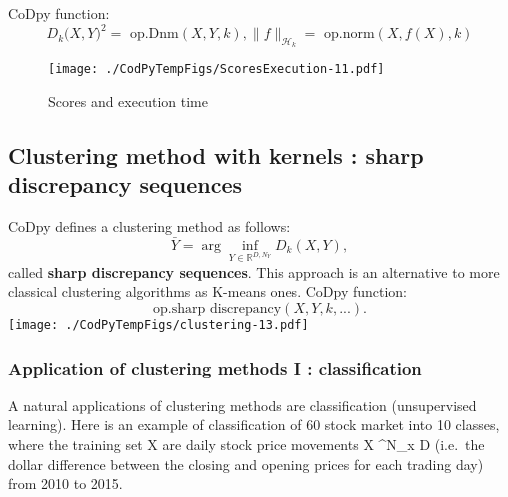 \documentclass[
]{article}
\def\({}%
\def\){}%
\numberwithin{equation}{section}
\newcommand \RR    {\mathbb{R}}
\begin{document}
CoDpy function:
\[D_k\big(X,Y\big)^2 = \text{ op.Dnm}(X,Y,k),\| f \|_{\mathcal{H}_k}=\text{ op.norm}(X,
f(X),k)\]

\begin{figure}
\centering
\texttt{[image: ./CodPyTempFigs/ScoresExecution-11.pdf]}
\caption{Scores and execution time}
\end{figure}

\newpage

\hypertarget{clustering-method-with-kernels-sharp-discrepancy-sequences}{%
\subsection{Clustering method with kernels : sharp discrepancy
sequences}\label{clustering-method-with-kernels-sharp-discrepancy-sequences}}

CoDpy defines a clustering method as follows:
\begin{equation} \label{cluster}
 \bar{Y} = \arg \inf_{Y \in \RR^{D,N_Y}} D_k(X,Y),
\end{equation} called \textbf{sharp discrepancy sequences}. This
approach is an alternative to more classical clustering algorithms as
K-means ones. CoDpy function: \[
\text{op.sharp discrepancy}(X,Y,k,...).
\] \texttt{[image: ./CodPyTempFigs/clustering-13.pdf]}

\newpage

\hypertarget{application-of-clustering-methods-i-classification}{%
\subsubsection{Application of clustering methods I :
classification}\label{application-of-clustering-methods-i-classification}}

A natural applications of clustering methods are classification
(unsupervised learning). Here is an example of classification of 60
stock market into 10 classes, where the training set \(X\) are daily
stock price movements \(X \in {}^{N_{x} \times D}\) (i.e.~the
dollar difference between the closing and opening prices for each
trading day) from \(2010\) to \(2015\).
\end{document}

